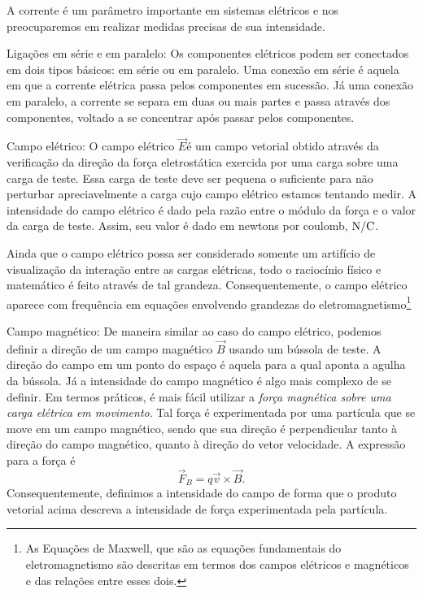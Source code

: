 \begin{description}
    A corrente é um parâmetro importante em sistemas elétricos e nos preocuparemos em realizar medidas precisas de sua intensidade.
    
    \item{Ligações em série e em paralelo:} Os componentes elétricos podem ser conectados em dois tipos básicos: em série ou em paralelo. Uma conexão em série é aquela em que a corrente elétrica passa pelos componentes em sucessão. Já uma conexão em paralelo, a corrente se separa em duas ou mais partes e passa através dos componentes, voltado a se concentrar após passar pelos componentes.
    
    \item{Campo elétrico:} O campo elétrico $\vec{E}$é um campo vetorial obtido através da verificação da direção da força eletrostática exercida por uma carga sobre uma carga de teste. Essa carga de teste deve ser pequena o suficiente para não perturbar apreciavelmente a carga cujo campo elétrico estamos tentando medir. A intensidade do campo elétrico é dado pela razão entre o módulo da força e o valor da carga de teste. Assim, seu valor é dado em newtons por coulomb, $\rm{N}/\rm{C}$.
    
    Ainda que o campo elétrico possa ser considerado somente um artifício de visualização da interação entre as cargas elétricas, todo o raciocínio físico e matemático é feito através de tal grandeza. Consequentemente, o campo elétrico aparece com frequência em equações envolvendo grandezas do eletromagnetismo\footnote{As Equações de Maxwell, que são as equações fundamentais do eletromagnetismo são descritas em termos dos campos elétricos e magnéticos e das relações entre esses dois.}
    
    \item{Campo magnético:} De maneira similar ao caso do campo elétrico, podemos definir a direção de um campo magnético $\vec{B}$ usando um bússola de teste. A direção do campo em um ponto do espaço é aquela para a qual aponta a agulha da bússola. Já a intensidade do campo magnético é algo mais complexo de se definir. Em termos práticos, é mais fácil utilizar a \emph{força magnética sobre uma carga elétrica em movimento}. Tal força é experimentada por uma partícula que se move em um campo magnético, sendo que sua direção é perpendicular tanto à direção do campo magnético, quanto à direção do vetor velocidade. A expressão para a força é
    \begin{equation}\label{Eq:DefFMagChar}
        \vec{F}_B = q \vec{v}\times\vec{B}.
    \end{equation}
    Consequentemente, definimos a intensidade do campo de forma que o produto vetorial acima descreva a intensidade de força experimentada pela partícula.
    

\end{description}
